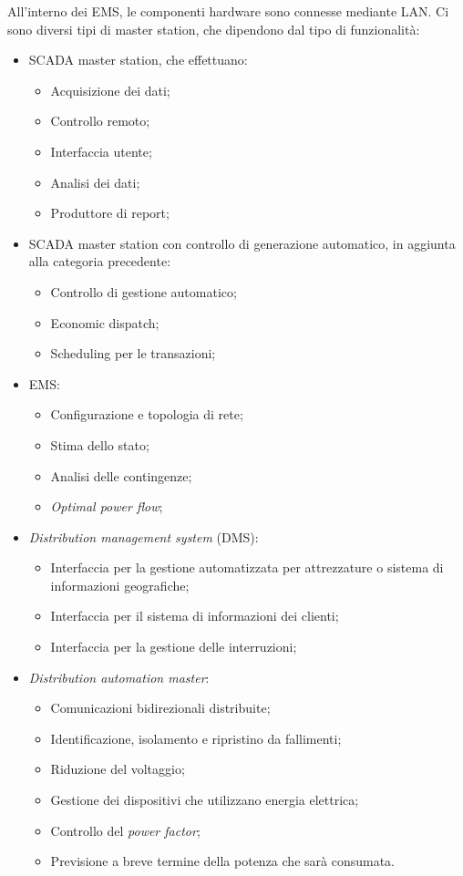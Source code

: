 All'interno dei EMS, le componenti hardware sono connesse mediante LAN. Ci sono diversi tipi di master station, che dipendono dal tipo di funzionalità:
\begin{itemize}
	\item SCADA master station, che effettuano:
	\begin{itemize}
		\item Acquisizione dei dati;
		\item Controllo remoto;
		\item Interfaccia utente;
		\item Analisi dei dati;
		\item Produttore di report;
	\end{itemize}
	\item SCADA master station con controllo di generazione automatico, in aggiunta alla categoria precedente:
	\begin{itemize}
		\item Controllo di gestione automatico;
		\item Economic dispatch;
		\item Scheduling per le transazioni;
	\end{itemize}
	\item EMS:
	\begin{itemize}
		\item Configurazione e topologia di rete;
		\item Stima dello stato;
		\item Analisi delle contingenze;
		\item \emph{Optimal power flow};
	\end{itemize}
	\item \emph{Distribution management system} (DMS):
	\begin{itemize}
		\item Interfaccia per la gestione automatizzata per attrezzature o sistema di informazioni geografiche;
		\item Interfaccia per il sistema di informazioni dei clienti;
		\item Interfaccia per la gestione delle interruzioni;
	\end{itemize}	 
	\item \emph{Distribution automation master}:
	\begin{itemize}
		\item Comunicazioni bidirezionali distribuite;
		\item Identificazione, isolamento e ripristino da fallimenti;
		\item Riduzione del voltaggio;
		\item Gestione dei dispositivi che utilizzano energia elettrica;
		\item Controllo del \emph{power factor};
		\item Previsione a breve termine della potenza che sarà consumata.
	\end{itemize}
\end{itemize} 

